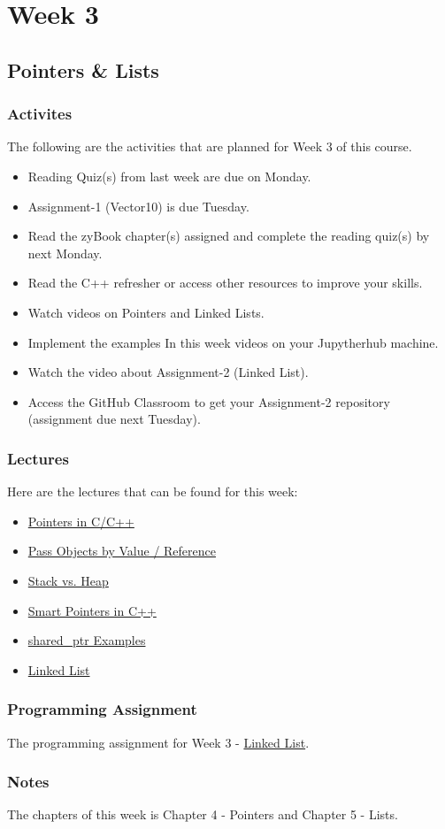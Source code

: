 \clearpage
\chapter{Week 3}

\section{Pointers \& Lists}
\horizontalline

\subsection{Activites}
The following are the activities that are planned for Week 3 of this course.
\begin{itemize}
    \item Reading Quiz(s) from last week are due on Monday.
    \item Assignment-1 (Vector10) is due Tuesday.
    \item Read the zyBook chapter(s) assigned and complete the reading quiz(s) by next Monday.
    \item Read the C++ refresher or access other resources to improve your skills.
    \item Watch videos on Pointers and Linked Lists.
    \item Implement the examples In this week videos on your Jupytherhub machine.
    \item Watch the video about Assignment-2 (Linked List).
    \item Access the GitHub Classroom to get your Assignment-2 repository  (assignment due next Tuesday).
\end{itemize}

\subsection{Lectures}
Here are the lectures that can be found for this week:
\begin{itemize}
    \item \href{https://applied.cs.colorado.edu/mod/hvp/view.php?id=45893}{Pointers in C/C++}
    \item \href{https://applied.cs.colorado.edu/mod/hvp/view.php?id=45894}{Pass Objects by Value / Reference}
    \item \href{https://applied.cs.colorado.edu/mod/hvp/view.php?id=45895}{Stack vs. Heap}
    \item \href{https://applied.cs.colorado.edu/mod/hvp/view.php?id=45896}{Smart Pointers in C++}
    \item \href{https://applied.cs.colorado.edu/mod/hvp/view.php?id=45897}{shared\_ptr Examples}
    \item \href{https://applied.cs.colorado.edu/mod/hvp/view.php?id=45898}{Linked List}
\end{itemize}

\subsection{Programming Assignment}
The programming assignment for Week 3 - \href{https://github.com/cu-cspb-2270-Summer-2023/pa2-RelativiBit}{Linked List}.

\subsection{Notes}
The chapters of this week is Chapter 4 - Pointers and Chapter 5 - Lists. \\